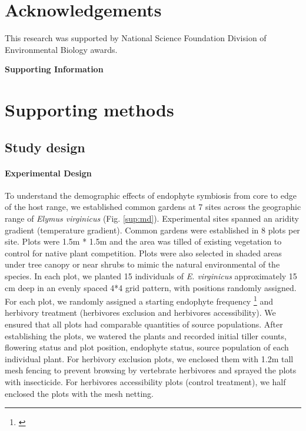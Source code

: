 \documentclass[12pt]{article}\usepackage[]{graphicx}\usepackage[dvipsnames]{xcolor}
\newcommand{\jacob}[2]{{\color{blue}{#1}}\footnote{\textit{\color{blue}{#2}}}}
\begin{document}
\section*{Acknowledgements}
This research was supported by National Science Foundation Division of Environmental Biology awards.



\newpage


\newpage
\clearpage 
\setcounter{equation}{0}
\setcounter{figure}{0}
\setcounter{section}{0}
\setcounter{table}{0}
\renewcommand{\theequation}{S.\arabic{equation}}
\renewcommand{\thetable}{S-\arabic{table}}
\renewcommand{\thefigure}{S-\arabic{figure}}
\renewcommand{\thesection}{S.\arabic{section}}

\centerline{\Large{\textbf{Supporting Information}}}
\section {Supporting methods}
\subsection*{Study design}
\paragraph {Experimental Design} 
To understand the demographic effects of endophyte symbiosis from core to edge of the host range, we established  common gardens at 7 sites across the geographic range of \emph {Elymus virginicus} (Fig. \ref{sup:md}).
Experimental sites spanned an aridity gradient (temperature gradient).
Common gardens were established in 8 plots per site. 
Plots were 1.5m * 1.5m and the area was tilled of existing vegetation to control for native plant competition.
Plots were also selected in shaded areas under tree canopy or near shrubs to mimic the natural environmental of the species.
In each plot,  we planted 15 individuals  of \emph{E. virginicus} approximately 15 cm deep in an evenly spaced 4*4 grid pattern, with positions randomly assigned. 
For each plot, we randomly assigned a starting endophyte frequency  \jacob{(80\%, 60\%, 40\%, 20\%)}{Do we need a schematic of one replicate
of the experimental design?} and herbivory treatment (herbivores exclusion and herbivores accessibility). 
We ensured that all plots had comparable quantities of source populations.
After establishing the plots, we watered the plants and recorded initial tiller counts, flowering status and plot position,  endophyte status, source population of each individual plant. 
For herbivory exclusion plots, we enclosed them with 1.2m tall mesh fencing to prevent browsing by vertebrate herbivores and sprayed the plots with insecticide. 
For herbivores accessibility plots (control treatment), we half enclosed the plots with the mesh netting.
\end{document}
